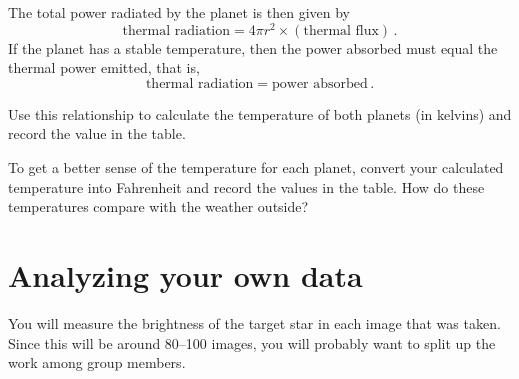 The total power radiated by the planet is then given by
\begin{equation}
\textrm{thermal radiation} = 4 \pi r^2 \times (\textrm{thermal flux}) \,.
\end{equation}
If the planet has a stable temperature, then the power absorbed must
equal the thermal power emitted, that is,
\begin{equation}
 \textrm{thermal radiation} = \textrm{power absorbed} \,.
\end{equation}

\begin{steps}
\item Use this relationship to calculate the temperature of both planets (in
kelvins) and record the value in the table.

\item To get a better sense of the temperature for each planet, convert your
calculated temperature into Fahrenheit and record the values in the table. How do these temperatures compare with the weather outside?

\end{steps}

\section{Analyzing your own data}

You will measure the brightness of the target star in each image that was taken. Since this will be around 80--100 images, you will probably want to split up the work among group members.

